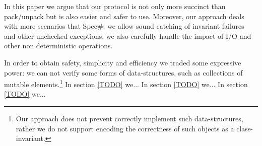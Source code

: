 In this paper we argue that our protocol is not only more succinct than pack/unpack but is also easier and safer to use.
Moreover, our approach deals 
with more 
scenarios that Spec\#:
we allow sound catching of invariant failures and other unchecked exceptions, we also carefully handle
the impact of I/O and other non deterministic operations.



In order to obtain safety, simplicity and efficiency we traded some expressive power:
we can not verify some forms of data-structures, such as collections of mutable elements.\footnote{Our approach does not prevent correctly implement such data-structures, rather we do not support encoding the correctness of such objects as a class-invariant.}
In section \ref{TODO} we...
In section \ref{TODO} we...
In section \ref{TODO} we...

